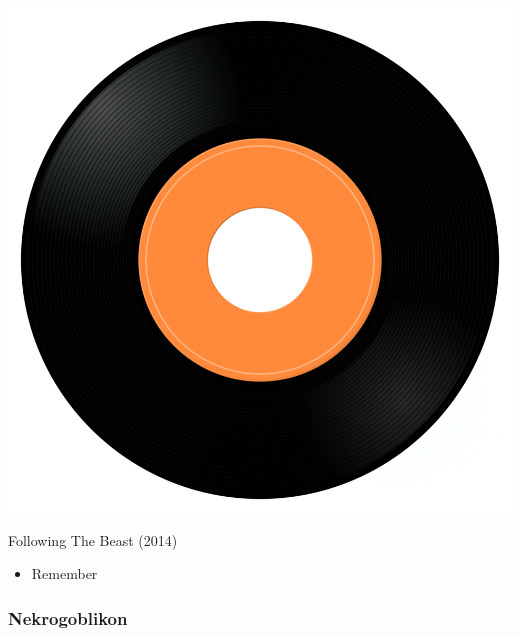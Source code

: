 \begin{minipage}[t]{0.25\textwidth}\vspace{0pt}
\captionsetup{type=figure}
\includegraphics[width=\textwidth]{Images/cover.png}
\caption*{Following The Beast (2014)}
\end{minipage}
\begin{minipage}[t]{0.25\textwidth}\vspace{0pt}
\begin{itemize}[nosep,leftmargin=1em,labelwidth=*,align=left]
	\setlength{\itemsep}{0pt}
	\item Remember
\end{itemize}
\end{minipage}

\subsubsection{Nekrogoblikon}

